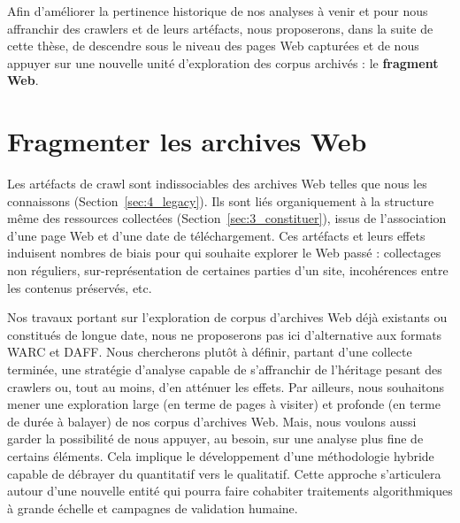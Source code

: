 \documentclass[symmetric,justified,marginals=raggedouter]{tufte-book}
\begin{document}
Afin d'améliorer la pertinence historique de nos analyses à venir et pour nous affranchir des crawlers et de leurs artéfacts, nous proposerons, dans la suite de cette thèse, de descendre sous le niveau des pages Web capturées et de nous appuyer sur une nouvelle unité d'explo\-ration des corpus archivés : le \textbf{fragment Web}. 


\chapter{Fragmenter les archives Web}
\label{chap:5}

\par\noindent Les artéfacts de crawl sont indissociables des archives Web telles que nous les connaissons (Section~\ref{sec:4_legacy}). Ils sont liés organiquement à la structure même des ressources collectées (Section~\ref{sec:3_constituer}), issus de l'as\-sociation d'une page Web et d'une date de téléchargement. Ces artéfacts et leurs effets induisent nombres de biais pour qui souhaite explorer le Web passé : collectages non réguliers, sur-représenta\-tion de certaines parties d'un site, incohérences entre les contenus préservés, etc. 

Nos travaux portant sur l'exploration de corpus d'archives Web déjà existants ou constitués de longue date, nous ne proposerons pas ici d'alternative aux formats WARC et DAFF. Nous chercherons plutôt à définir, partant d'une collecte terminée, une stratégie d'analyse capable de s'affranchir de l'héritage pesant des crawlers ou, tout au moins, d'en atténuer les effets. Par ailleurs, nous souhaitons mener une exploration large (en terme de pages à visiter) et profonde (en terme de durée à balayer) de nos corpus d'archives Web. Mais, nous voulons aussi garder la possibilité de nous appuyer, au besoin, sur une analyse plus fine de certains éléments. Cela implique le développement d'une méthodologie hybride capable de débrayer du quantitatif vers le qualitatif. Cette approche s'articulera autour d'une nouvelle entité qui pourra faire cohabiter traitements algorithmiques à grande échelle et campagnes de validation humaine.
\end{document}
